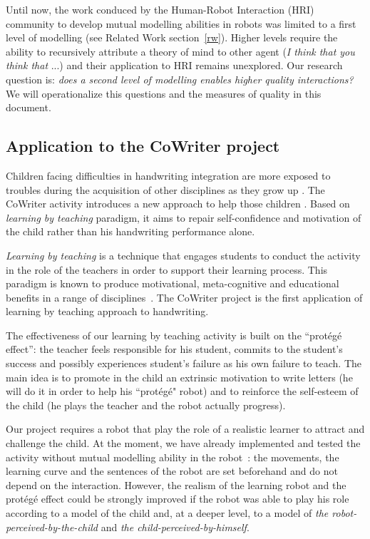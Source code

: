\documentclass[10pt,a4paper]{article}
\begin{document}
Until now, the work conduced by the Human-Robot Interaction (HRI) community to develop mutual modelling abilities in robots was limited to a first level of modelling (see Related Work section~\ref{rw}). Higher levels require the ability to recursively attribute a theory of mind to other agent (\textit{I think that you think that} ...) and their application to HRI remains unexplored.
Our research question is: \textit{does a second level of modelling enables higher quality interactions?} We will operationalize this questions and the measures of quality in this document.

\subsection{Application to the CoWriter project}
Children facing difficulties in handwriting integration are more exposed
to troubles during the acquisition of other disciplines as they grow up
\cite{Christensen2005}. 
The CoWriter activity introduces a new approach to help those children
\cite{Hood}. Based on \emph{learning by teaching} paradigm, it aims to repair self-confidence and motivation of the child rather than his handwriting performance alone.

\emph{Learning by teaching} is a technique that engages students to conduct the activity in the role of the teachers in order to support their learning process. This 
paradigm is known to produce motivational, meta-cognitive and educational
benefits in a range of disciplines~\cite{Rohrbeck2003}. The CoWriter project
is the first application of learning by teaching approach to handwriting. 

The effectiveness of our learning by teaching activity is built on the
``prot\'eg\'e effect'': the teacher feels responsible for his student, commits
to the student's success and possibly experiences student's failure as his own
failure to teach. The main idea is to promote in the child an extrinsic motivation to write letters (he will do it in order to help his ``prot\'eg\'e" robot) and to reinforce the self-esteem of the child (he plays the teacher and the robot actually progress).

Our project requires a robot that play the role of a realistic learner to attract and challenge the child. At the moment, we have already implemented and tested the activity without mutual modelling ability in the robot~\cite{Hood}: the movements, the learning curve and the sentences of the robot are set beforehand and do not depend on the interaction. However, the realism of the learning robot and the prot\'eg\'e effect could be strongly improved if the robot was able to play his role according to a model of the child and, at a deeper level, to a model of \textit{the robot-perceived-by-the-child} and \textit{the child-perceived-by-himself}.
\end{document}
